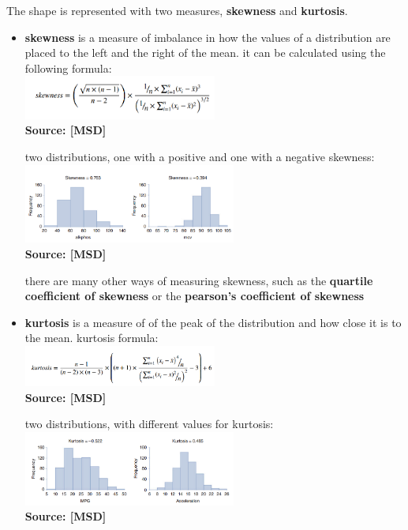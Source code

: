 The shape is represented with two measures, \textbf{skewness} and \textbf{kurtosis}.  
\begin{itemize}
\item \textbf{skewness} is a measure of imbalance in how the values of a distribution are placed to the left and the right of the mean. it can be calculated using the following formula:\\ [1ex]
\includegraphics[width=0.5\textwidth]{skewness_formula.png} \\ [-1.5ex]
     {\fontsize{10}{0}\selectfont \textbf{Source: [MSD]}}

two distributions, one with a positive and one with a negative skewness:\\ [1ex]
\includegraphics[width=0.55\textwidth]{skewness_picture.png} \\ [-1.5ex]
{\fontsize{10}{0}\selectfont \textbf{Source: [MSD]}}

there are many other ways of measuring skewness, such as the \textbf{quartile coefficient of skewness} or the \textbf{pearson's coefficient of skewness}

\item \textbf{kurtosis} is a measure of of the peak of the distribution and how close it is to the mean. kurtosis formula: \\[1ex]
\includegraphics[width=0.5\textwidth]{kurtosis_formula.png} \\ [-1.5ex]
     {\fontsize{10}{0}\selectfont \textbf{Source: [MSD]}}

two distributions, with different values for kurtosis:\\ [1ex]
\includegraphics[width=0.55\textwidth]{kurtosis_picture.png} \\ [-1.5ex]
     {\fontsize{10}{0}\selectfont \textbf{Source: [MSD]}}



\end{itemize}
\newpage

